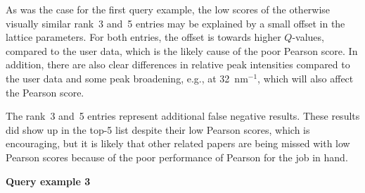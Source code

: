 \documentclass[preprint]{iucr}
\begin{document}
As was the case for the first query example, the low scores of the otherwise visually similar rank~3 and~5 entries may be explained by a small offset in the lattice parameters. For both entries, the offset is towards higher $Q$-values, compared to the user data, which is the likely cause of the poor Pearson score. In addition, there are also clear differences in relative peak intensities compared to the user data and some peak broadening, e.g., at 32~nm$^{-1}$, which will also affect the Pearson score.

The rank~3 and~5 entries represent additional false negative results.  These results did show up in the top-5 list despite their low Pearson scores, which is encouraging, but it is likely that other related papers are being missed with low Pearson scores because of the poor performance of Pearson for the job in hand.


\textbf{Query example 3}
\end{document}
